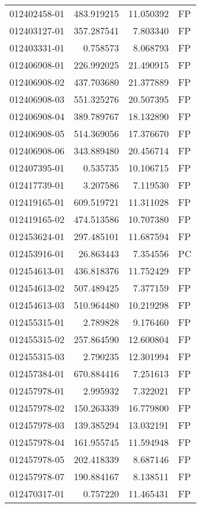 \begin{tabular}{lrrl}
012402458-01 &  483.919215 &    11.050392 &   FP \\
012403127-01 &  357.287541 &     7.803340 &   FP \\
012403331-01 &    0.758573 &     8.068793 &   FP \\
012406908-01 &  226.992025 &    21.490915 &   FP \\
012406908-02 &  437.703680 &    21.377889 &   FP \\
012406908-03 &  551.325276 &    20.507395 &   FP \\
012406908-04 &  389.789767 &    18.132890 &   FP \\
012406908-05 &  514.369056 &    17.376670 &   FP \\
012406908-06 &  343.889480 &    20.456714 &   FP \\
012407395-01 &    0.535735 &    10.106715 &   FP \\
012417739-01 &    3.207586 &     7.119530 &   FP \\
012419165-01 &  609.519721 &    11.311028 &   FP \\
012419165-02 &  474.513586 &    10.707380 &   FP \\
012453624-01 &  297.485101 &    11.687594 &   FP \\
012453916-01 &   26.863443 &     7.354556 &   PC \\
012454613-01 &  436.818376 &    11.752429 &   FP \\
012454613-02 &  507.489425 &     7.377159 &   FP \\
012454613-03 &  510.964480 &    10.219298 &   FP \\
012455315-01 &    2.789828 &     9.176460 &   FP \\
012455315-02 &  257.864590 &    12.600804 &   FP \\
012455315-03 &    2.790235 &    12.301994 &   FP \\
012457384-01 &  670.884416 &     7.251613 &   FP \\
012457978-01 &    2.995932 &     7.322021 &   FP \\
012457978-02 &  150.263339 &    16.779800 &   FP \\
012457978-03 &  139.385294 &    13.032191 &   FP \\
012457978-04 &  161.955745 &    11.594948 &   FP \\
012457978-05 &  202.418339 &     8.687146 &   FP \\
012457978-07 &  190.884167 &     8.138511 &   FP \\
012470317-01 &    0.757220 &    11.465431 &   FP \\

\end{tabular}
